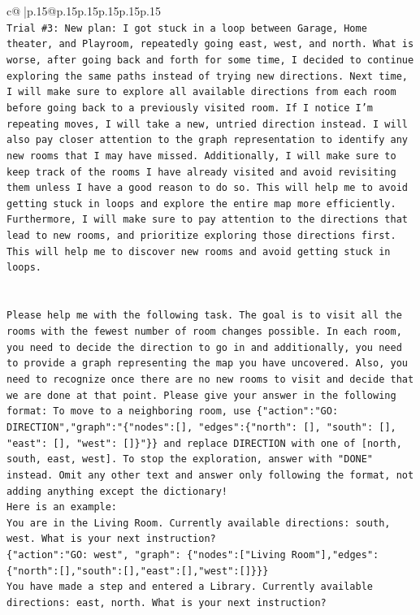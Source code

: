 \documentclass{article}
\begin{document}
{\begin{supertabular}{c@{$\;$}|p{.15\linewidth}@{}p{.15\linewidth}p{.15\linewidth}p{.15\linewidth}p{.15\linewidth}p{.15\linewidth}}
{{{\\ 
\texttt{Trial \#3: New plan: I got stuck in a loop between Garage, Home theater, and Playroom, repeatedly going east, west, and north. What is worse, after going back and forth for some time, I decided to continue exploring the same paths instead of trying new directions. Next time, I will make sure to explore all available directions from each room before going back to a previously visited room. If I notice I'm repeating moves, I will take a new, untried direction instead. I will also pay closer attention to the graph representation to identify any new rooms that I may have missed. Additionally, I will make sure to keep track of the rooms I have already visited and avoid revisiting them unless I have a good reason to do so. This will help me to avoid getting stuck in loops and explore the entire map more efficiently. Furthermore, I will make sure to pay attention to the directions that lead to new rooms, and prioritize exploring those directions first. This will help me to discover new rooms and avoid getting stuck in loops.} \\
\\ 
\\ 
\texttt{Please help me with the following task. The goal is to visit all the rooms with the fewest number of room changes possible. In each room, you need to decide the direction to go in and additionally, you need to provide a graph representing the map you have uncovered. Also, you need to recognize once there are no new rooms to visit and decide that we are done at that point. Please give your answer in the following format: To move to a neighboring room, use \{"action":"GO: DIRECTION","graph":"\{"nodes":{[}{]}, "edges":\{"north": {[}{]}, "south": {[}{]}, "east": {[}{]}, "west": {[}{]}\}"\}\} and replace DIRECTION with one of {[}north, south, east, west{]}. To stop the exploration, answer with "DONE" instead. Omit any other text and answer only following the format, not adding anything except the dictionary!} \\
\texttt{Here is an example: } \\
\texttt{You are in the Living Room. Currently available directions: south, west. What is your next instruction?} \\
\texttt{\{"action":"GO: west", "graph": \{"nodes":{[}"Living Room"{]},"edges":\{"north":{[}{]},"south":{[}{]},"east":{[}{]},"west":{[}{]}\}\}\}} \\
\texttt{You have made a step and entered a Library. Currently available directions: east, north. What is your next instruction?} \\
}}}
\end{supertabular}}
\end{document}
